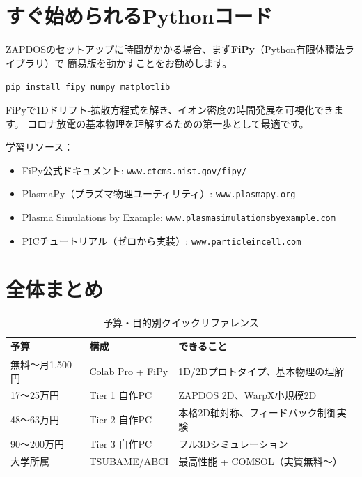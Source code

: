 \documentclass[12pt,a4paper]{ltjsarticle}
\begin{document}
\section{すぐ始められるPythonコード}

ZAPDOSのセットアップに時間がかかる場合、まず\textbf{FiPy}（Python有限体積法ライブラリ）で
簡易版を動かすことをお勧めします。

\begin{successbox}
\texttt{pip install fipy numpy matplotlib}

FiPyで1Dドリフト-拡散方程式を解き、イオン密度の時間発展を可視化できます。
コロナ放電の基本物理を理解するための第一歩として最適です。

\vspace{0.5cm}
学習リソース：
\begin{itemize}[leftmargin=2em]
  \item FiPy公式ドキュメント: \texttt{www.ctcms.nist.gov/fipy/}
  \item PlasmaPy（プラズマ物理ユーティリティ）: \texttt{www.plasmapy.org}
  \item Plasma Simulations by Example: \texttt{www.plasmasimulationsbyexample.com}
  \item PICチュートリアル（ゼロから実装）: \texttt{www.particleincell.com}
\end{itemize}
\end{successbox}

\section{全体まとめ}

\begin{table}[h]
\centering\sffamily\small
\caption{予算・目的別クイックリファレンス}
\begin{tabular}{@{}p{3cm}p{3.5cm}p{5cm}@{}}
\toprule
\textbf{予算} & \textbf{構成} & \textbf{できること} \\
\midrule
無料〜月1,500円 & Colab Pro + FiPy & 1D/2Dプロトタイプ、基本物理の理解 \\
17〜25万円 & Tier 1 自作PC & ZAPDOS 2D、WarpX小規模2D \\
48〜63万円 & Tier 2 自作PC & 本格2D軸対称、フィードバック制御実験 \\
90〜200万円 & Tier 3 自作PC & フル3Dシミュレーション \\
大学所属 & TSUBAME/ABCI & 最高性能 + COMSOL（実質無料〜） \\
\bottomrule
\end{tabular}
\end{table}
\end{document}
